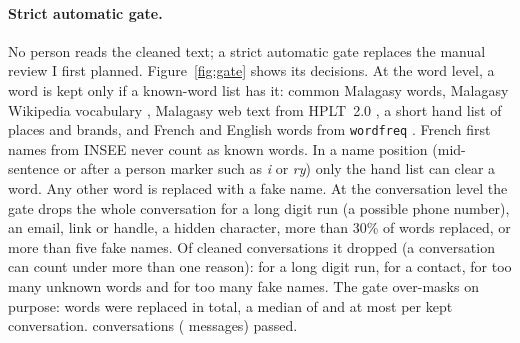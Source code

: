 \documentclass[11pt]{article}
\begin{document}
\paragraph{Strict automatic gate.} No person reads the cleaned text; a strict automatic gate replaces the
manual review I first planned. Figure~\ref{fig:gate} shows its decisions. At the word level, a word is
kept only if a known-word list has it: common Malagasy words, Malagasy Wikipedia vocabulary
\citep{wikipedia-dump}, Malagasy web text from HPLT~2.0 \citep{hplt2}, a short hand list of places and
brands, and French and English words from \texttt{wordfreq} \citep{wordfreq}. French first names from
INSEE \citep{insee-prenoms} never count as known words. In a name position (mid-sentence or after a
person marker such as \emph{i} or \emph{ry}) only the hand list can clear a word. Any other word is
replaced with a fake name. At the conversation level the gate drops the whole conversation for a long
digit run (a possible phone number), an email, link or handle, a hidden character, more than 30\% of
words replaced, or more than five fake names. Of \fyGateBefore{} cleaned conversations it dropped
\fyGateDropped{} (a conversation can count under more than one reason): \fyGateDroppedNumber{} for a
long digit run, \fyGateDroppedContact{} for a contact, \fyGateDroppedUnknown{} for too many unknown words
and \fyGateDroppedFakes{} for too many fake names. The gate over-masks on purpose: \fyGateReplaced{} words
were replaced in total, a median of \fyGateFakesMedian{} and at most \fyGateFakesMax{} per kept
conversation. \fyGateKept{} conversations (\fyDataKeptMessages{} messages) passed.
\end{document}
